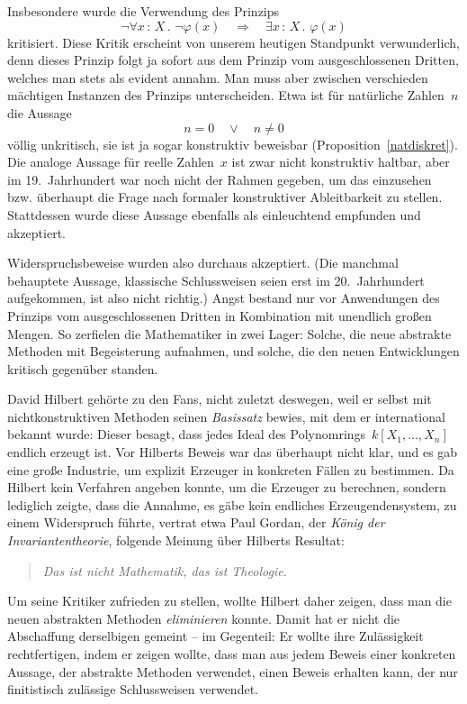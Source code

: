 \documentclass[a4paper,ngerman,12pt]{scrartcl}
\theoremstyle{definition}
\theoremstyle{plain}
\theoremstyle{remark}
\renewcommand{\_}{\mathpunct{.}\,}
\newcommand{\?}{\,{:}\,}
\begin{document}
Insbesondere wurde die Verwendung des Prinzips
\[ \neg\forall x\?X\_ \neg\varphi(x) \quad\Longrightarrow\quad
  \exists x\?X\_ \varphi(x) \]
kritisiert. Diese Kritik erscheint von unserem heutigen Standpunkt verwunderlich, denn
dieses Prinzip folgt ja sofort aus dem Prinzip vom ausgeschlossenen Dritten,
welches man stets als evident annahm. Man muss aber zwischen verschieden
mächtigen Instanzen des Prinzips unterscheiden. Etwa ist für natürliche
Zahlen~$n$ die Aussage
\[ n = 0 \quad\vee\quad n \neq 0 \]
völlig unkritisch, sie ist ja sogar konstruktiv beweisbar (Proposition~\ref{natdiskret}). Die analoge Aussage für
reelle Zahlen~$x$ ist zwar nicht konstruktiv haltbar, aber im 19.~Jahrhundert
war noch nicht der Rahmen gegeben, um das einzusehen bzw. überhaupt die Frage
nach formaler konstruktiver Ableitbarkeit zu stellen. Stattdessen wurde diese
Aussage ebenfalls als einleuchtend empfunden und akzeptiert.

Widerspruchsbeweise wurden also durchaus akzeptiert. (Die manchmal behauptete
Aussage, klassische Schlussweisen seien erst im 20.~Jahrhundert aufgekommen, ist also
nicht richtig.) Angst bestand nur vor Anwendungen des Prinzips vom
ausgeschlossenen Dritten in Kombination mit unendlich großen Mengen. So
zerfielen die Mathematiker in zwei Lager: Solche, die neue abstrakte Methoden
mit Begeisterung aufnahmen, und solche, die den neuen Entwicklungen kritisch
gegenüber standen.

David Hilbert gehörte zu den Fans, nicht zuletzt deswegen, weil er selbst mit
nichtkonstruktiven Methoden seinen \emph{Basissatz} bewies, mit dem er
international bekannt wurde: Dieser besagt, dass jedes Ideal des
Polynomrings~$k[X_1,\ldots,X_n]$ endlich erzeugt ist. Vor Hilberts Beweis war
das überhaupt nicht klar, und es gab eine große Industrie, um explizit Erzeuger in
konkreten Fällen zu bestimmen. Da Hilbert kein Verfahren angeben konnte,
um die Erzeuger zu berechnen, sondern lediglich zeigte, dass die Annahme,
es gäbe kein endliches Erzeugendensystem, zu einem Widerspruch führte, vertrat
etwa Paul Gordan, der \emph{König der
Invariantentheorie}, folgende Meinung über Hilberts Resultat:
\begin{quote}
\emph{Das ist nicht Mathematik, das ist Theologie.}
\end{quote}

Um seine Kritiker zufrieden zu stellen, wollte Hilbert daher zeigen, dass man
die neuen abstrakten Methoden \emph{eliminieren} konnte. Damit hat er nicht die
Abschaffung derselbigen gemeint -- im Gegenteil: Er wollte ihre Zulässigkeit
rechtfertigen, indem er zeigen wollte, dass man aus jedem Beweis einer
konkreten Aussage, der abstrakte Methoden verwendet, einen Beweis erhalten
kann, der nur finitistisch zulässige Schlussweisen verwendet.
\end{document}
